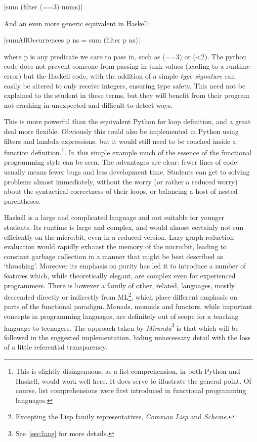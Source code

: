 \documentclass[12pt, a4paper]{report}
\begin{document}
|sum (filter (==3) nums)|

And an even more generic equivalent in Haskell:

|sumAllOccurrences p ns = sum (filter p ns)|

where p is any predicate we care to pass in, such as (==3) or (\textless2). The python code does not
prevent someone from passing in junk values (leading to a runtime error) but the Haskell code, with
the addition of a simple \textit{type signature} can easily be altered to only receive integers,
ensuring type safety. This need not be explained to the student in these terms, but they will
benefit from their program not crashing in unexpected and difficult-to-detect ways. 

This is more powerful than the equivalent Python for loop definition, and a great deal more
flexible. Obviously this could also be implemented in Python using filters and lambda expressions,
but it would still need to be couched inside a function definition.\footnote{This is slightly
disingenuous, as a list comprehension, in both Python and Haskell, would work well here. It does
serve to illustrate the general point. Of course, list comprehensions were first introduced in
functional programming languages.}. In this simple example much of the essence of the functional
programming style can be seen. The advantages are clear: fewer lines of code usually means fewer
bugs and less development time. Students can get to solving problems almost immediately, without the
worry (or rather a reduced worry) about the syntactical correctness of their loops, or balancing a
host of nested parentheses.

Haskell is a large and complicated language and not suitable for younger students. Its runtime
is large and complex, and would almost certainly not run efficiently on the micro:bit, even
in a reduced version. Lazy graph-reduction evaluation would rapidly exhaust the memory of the
micro:bit, leading to constant garbage collection in a manner that might be best described as
`thrashing'. Moreover its emphasis on purity has led it to introduce a number of features which,
while theoretically elegant, are complex even for experienced programmers. There is however a family
of other, related, languages, mostly descended directly or indirectly from ML\footnote{Excepting
the Lisp family representatives, \textit{Common Lisp} and \textit{Scheme}.}, which place different
emphasis on parts of the functional paradigm. Monads, monoids and functors, while important concepts
in programming languages, are definitely out of scope for a teaching language to teenagers. The
approach taken by \textit{Miranda}\footnote{See~\ref{sec:lang} for more details.} is that which will
be followed in the suggested implementation, hiding unnecessary detail with the loss of a little
referential transparency.
\end{document}
